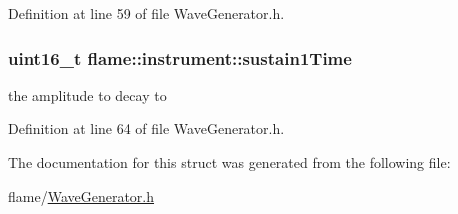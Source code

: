 Definition at line 59 of file Wave\-Generator.\-h.

\hypertarget{structflame_1_1instrument_a5214632ee985002310d9c94431f5391f}{
\subsubsection[{sustain1\-Time}]{\setlength{\rightskip}{0pt plus 5cm}uint16\-\_\-t flame\-::instrument\-::sustain1\-Time}}\label{structflame_1_1instrument_a5214632ee985002310d9c94431f5391f}
the amplitude to decay to 

Definition at line 64 of file Wave\-Generator.\-h.



The documentation for this struct was generated from the following file\-:\begin{DoxyCompactItemize}
\item 
flame/\hyperlink{_wave_generator_8h}{Wave\-Generator.\-h}\end{DoxyCompactItemize}
